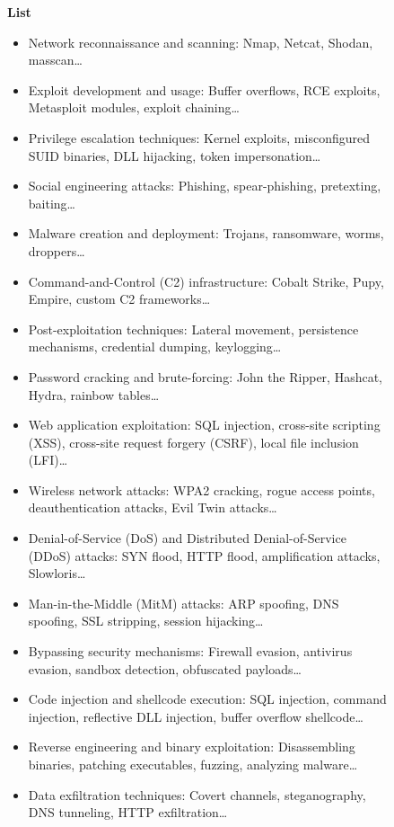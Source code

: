 \begin{figure}
\begin{tcolorbox}
\textbf{List} 
\begin{itemize}[nolistsep, leftmargin=*]
    \item Network reconnaissance and scanning: Nmap, Netcat, Shodan, masscan\ldots
    \item Exploit development and usage: Buffer overflows, RCE exploits, Metasploit modules, exploit chaining\ldots
    \item Privilege escalation techniques: Kernel exploits, misconfigured SUID binaries, DLL hijacking, token impersonation\ldots
    \item Social engineering attacks: Phishing, spear-phishing, pretexting, baiting\ldots
    \item Malware creation and deployment: Trojans, ransomware, worms, droppers\ldots
    \item Command-and-Control (C2) infrastructure: Cobalt Strike, Pupy, Empire, custom C2 frameworks\ldots
    \item Post-exploitation techniques: Lateral movement, persistence mechanisms, credential dumping, keylogging\ldots
    \item Password cracking and brute-forcing: John the Ripper, Hashcat, Hydra, rainbow tables\ldots
    \item Web application exploitation: SQL injection, cross-site scripting (XSS), cross-site request forgery (CSRF), local file inclusion (LFI)\ldots
    \item Wireless network attacks: WPA2 cracking, rogue access points, deauthentication attacks, Evil Twin attacks\ldots
    \item Denial-of-Service (DoS) and Distributed Denial-of-Service (DDoS) attacks: SYN flood, HTTP flood, amplification attacks, Slowloris\ldots
    \item Man-in-the-Middle (MitM) attacks: ARP spoofing, DNS spoofing, SSL stripping, session hijacking\ldots
    \item Bypassing security mechanisms: Firewall evasion, antivirus evasion, sandbox detection, obfuscated payloads\ldots
    \item Code injection and shellcode execution: SQL injection, command injection, reflective DLL injection, buffer overflow shellcode\ldots
    \item Reverse engineering and binary exploitation: Disassembling binaries, patching executables, fuzzing, analyzing malware\ldots
    \item Data exfiltration techniques: Covert channels, steganography, DNS tunneling, HTTP exfiltration\ldots

\end{itemize}
\end{tcolorbox}
\end{figure}
